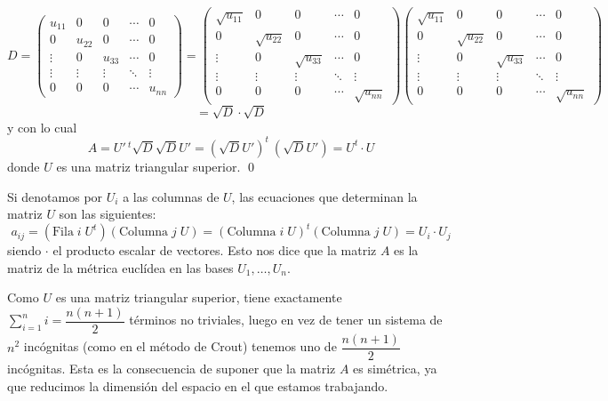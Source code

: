 \begin{dem}
$$D=\begin{pmatrix}
    u_{11}&0&0&\cdots &0\\
    0&u_{22}&0&\cdots &0\\
    \vdots & 0&u_{33}&\cdots&0\\
    \vdots&\vdots &\vdots&\ddots&\vdots \\
    0&0 &0&\cdots&u_{nn}
    \end{pmatrix}=\begin{pmatrix}
    \sqrt{u_{11}}&0&0&\cdots &0\\
    0&\sqrt{u_{22}}&0&\cdots &0\\
    \vdots & 0&\sqrt{u_{33}}&\cdots&0\\
    \vdots&\vdots &\vdots&\ddots&\vdots \\
    0&0 &0&\cdots&\sqrt{u_{nn}}
    \end{pmatrix}\begin{pmatrix}
    \sqrt{u_{11}}&0&0&\cdots &0\\
    0&\sqrt{u_{22}}&0&\cdots &0\\
    \vdots & 0&\sqrt{u_{33}}&\cdots&0\\
    \vdots&\vdots &\vdots&\ddots&\vdots \\
    0&0 &0&\cdots&\sqrt{u_{nn}}
    \end{pmatrix}$$
    $$=\sqrt{D} \cdot \sqrt{D}$$
    y con lo cual
    $$A=U'\,^t \sqrt{D} \sqrt{D} U' = \left(\sqrt{D} U'\right)^t \: \left(\sqrt{D} U'\right)=U^t \cdot U$$
    donde $U$ es una matriz triangular superior.
    \qed\end{dem}
\begin{obs}
Si denotamos por $U_i$ a las columnas de $U$, las ecuaciones que determinan la matriz $U$ son las siguientes:
    $$a_{ij}=(\text{Fila} \; i \; U^t)(\text{Columna} \; j \;U)=(\text{Columna} \; i \; U)^t (\text{Columna} \; j \;U)=U_i \cdot U_j$$
siendo $\cdot$ el producto escalar de vectores. Esto nos dice que la matriz $A$ es la matriz de la métrica euclídea en las bases $U_1,\ldots, U_n$.

Como $U$ es una matriz triangular superior, tiene exactamente $\sum_{i=1}^ni=\dfrac{n(n+1)}{2}$ términos no triviales, luego en vez de tener un sistema de $n^2$ incógnitas (como en el método de Crout) tenemos uno de $\dfrac{n(n+1)}{2}$ incógnitas. Esta es la consecuencia de suponer que la matriz $A$ es simétrica, ya que reducimos la dimensión del espacio en el que estamos trabajando.
\end{obs}
 
